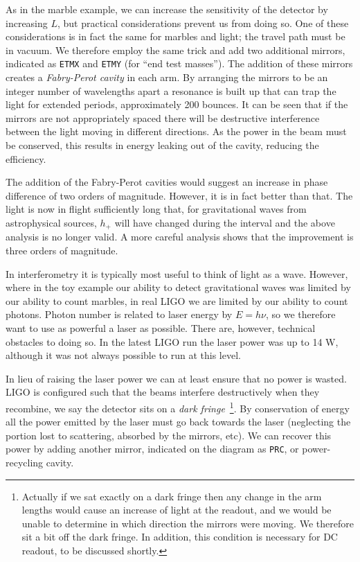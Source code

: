 As in the marble example, we can increase the sensitivity of the
detector by increasing $L$, but practical considerations prevent us
from doing so.  One of these considerations is in fact the same for
marbles and light; the travel path must be in vacuum.  We
therefore employ the same trick and add two additional mirrors,
indicated as \texttt{ETMX} and \texttt{ETMY} (for ``end test
masses'').  The addition of these mirrors creates a \emph{Fabry-Perot
cavity} in each arm.  By arranging the mirrors to be an integer
number of wavelengths apart a resonance is built up that can trap the
light for extended periods, approximately 200 bounces.  It can be seen
that if the mirrors are not appropriately spaced there will be
destructive interference between the light moving in different
directions.  As the power in the beam must be conserved, this results
in energy leaking out of the cavity, reducing the efficiency.

The addition of the Fabry-Perot cavities would suggest an increase in
phase difference of two orders of magnitude.  However, it is in fact
better than that.  The light is now in flight sufficiently long that,
for gravitational waves from astrophysical sources, $h_+$ will have
changed during the interval and the above analysis is no longer
valid.  A more careful analysis shows that the improvement is 
three orders of magnitude.

In interferometry it is typically most useful to think of light as a
wave.  However, where in the toy example our ability to detect
gravitational waves was limited by our ability to count marbles, in
real LIGO we are limited by our ability to count photons.  Photon
number is related to laser energy by $E=h\nu$, so we therefore want to
use as powerful a laser as possible.  There are, however, technical
obstacles to doing so.  In the latest LIGO run the laser power was up
to 14 W, although it was not always possible to run at this level.

In lieu of raising the laser power we can at least ensure that no
power is wasted.  LIGO is configured such that the beams interfere
destructively when they recombine, we say the detector sits on a
\emph{dark fringe}~\footnote{Actually if we sat exactly on a dark
fringe then any change in the arm lengths would cause an increase of
light at the readout, and we would be unable to determine in which
direction the mirrors were moving.  We therefore sit a bit off the
dark fringe.  In addition, this condition is necessary for DC readout,
to be discussed shortly.}.  By conservation of energy all the power
emitted by the laser must go back towards the laser (neglecting the
portion lost to scattering, absorbed by the mirrors, etc).  We can
recover this power by adding another mirror, indicated on the diagram
as \texttt{PRC}, or power-recycling cavity.

